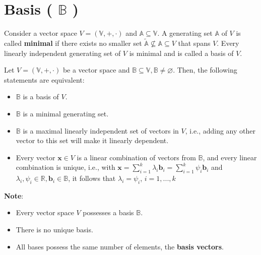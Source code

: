 \section{Basis ( $\mathbb{B}$ ) \cite{mfml-1}}\label{lin-alg: Basis}
Consider a vector space $V = (\mathbb{V}, +, \cdot)$ and $\mathbb{A} \subseteq \mathbb{V}$. A generating set $\mathbb{A}$ of $V$ is called \textbf{minimal} if there exists no smaller set $\tilde{\mathbb{A}} \not\subseteq \mathbb{A} \subseteq V$ that spans $V$. Every linearly independent generating set of $V$ is minimal and is called a basis of $V$.

\vspace{0.2cm}
Let $V = (\mathbb{V}, +, \cdot)$ be a vector space and $\mathbb{B} \subseteq \mathbb{V}, \mathbb{B} \neq \varnothing$. Then, the following statements are equivalent:

\begin{itemize}
    \item $\mathbb{B}$ is a basis of $V$.
    
    \item $\mathbb{B}$ is a minimal generating set.
    
    \item $\mathbb{B}$ is a maximal linearly independent set of vectors in $V$, i.e., adding any other vector to this set will make it linearly dependent.

    \item Every vector $\mathbf{x} \in V$ is a linear combination of vectors from $\mathbb{B}$, and every linear combination is unique, i.e., with \( \displaystyle \mathbf{x} = \sum_{i=1}^{k} \lambda_i \mathbf{b}_i = \sum_{i=1}^{k} \psi_i \mathbf{b}_i \) and $\lambda_i, \psi_i \in \mathbb{R}, \mathbf{b}_i \in \mathbb{B}$, it follows that $\lambda_i = \psi_i$, $i=1,...,k$

    
\end{itemize}

\vspace{0.2cm}
\textbf{Note}:
\begin{itemize}
    \item Every vector space $V$ possesses a basis $\mathbb{B}$. 
    
    \item There is no unique basis. 
    
    \item All bases possess the same number of elements, the \textbf{basis vectors}.

\end{itemize}

